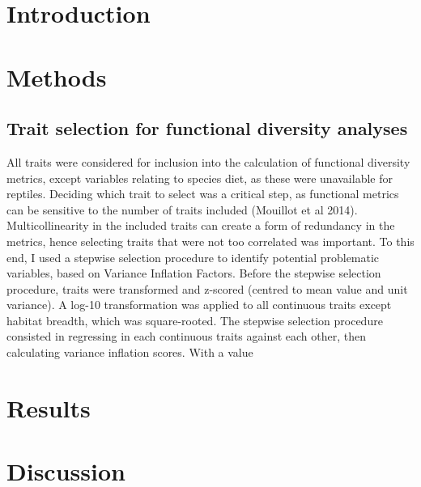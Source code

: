 \section{Introduction}
\section{Methods}
\subsection{Trait selection for functional diversity analyses}
All traits were considered for inclusion into the calculation of functional diversity metrics, except variables relating to species diet, as these were unavailable for reptiles. Deciding which trait to select was a critical step, as functional metrics can be sensitive to the number of traits included (Mouillot et al 2014). Multicollinearity in the included traits can create a form of redundancy in the metrics, hence selecting traits that were not too correlated was important. To this end, I used a stepwise selection procedure to identify potential problematic variables, based on Variance Inflation Factors. Before the stepwise selection procedure, traits were transformed and z-scored (centred to mean value and unit variance). A log-10 transformation was applied to all continuous traits except habitat breadth, which was square-rooted. The stepwise selection procedure consisted in regressing in each continuous traits against each other, then calculating variance inflation scores. With a value 


\section{Results}

\section{Discussion}
